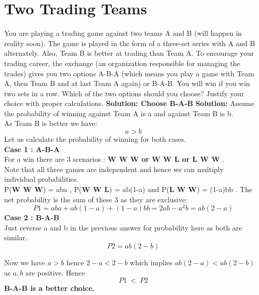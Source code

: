 \documentclass[12pt]{article}
\begin{document}
\section{Two Trading Teams}
You are playing a trading game against two teams A and B (will happen in reality soon). The
game is played in the form of a three-set series with A and B alternately. Also, Team B is better at
trading than Team A. To encourage your trading career, the exchange (an organization responsible
for managing the trades) gives you two options A-B-A (which means you play a game with Team A, then Team B and at last Team A again) or B-A-B. You will win if you win two sets in a row.
Which of the two options should you choose? Justify your choice with proper calculations.
\newline
\textbf{Solution: Choose B-A-B}
\newline \newline
\textbf{Solution: }
\newline
Assume the probability of winning against Team A is a and against Team B is b.\\
As Team B is better we have:  
\begin{equation}
    a > b
\end{equation}
Let us calculate the probability of winning for both cases.\\
\newline
\textbf{Case 1 : A-B-A} \\
For a win there are 3 scenarios : \textbf{W W W or W W L or L W W} . \\
Note that all three games are independent and hence we can multiply \\individual probabilities.\\
P(\textbf{W W W}) = aba , P(\textbf{W W L}) = ab(1-a) and P(\textbf{L W W}) = (1-a)bb .
The net probability is the sum of these 3 as they are exclusive: 
\begin{equation}
    P1 = aba+ab(1-a)+(1-a)bb = 2ab - a^2b = ab(2-a) 
\end{equation}
\newline
\textbf{Case 2 : B-A-B} \\
Just reverse a and b in the previous answer for probability here as both are similar.
\begin{equation}
    P2 = ab(2-b)
\end{equation}

Now we have $a>b$ hence $2-a<2-b$ which implies $ab(2-a)<ab(2-b)$ as $a,b$ are positive.
Hence 
\begin{equation*}
    P1\ <\ P2
\end{equation*}
\newline
\textbf{B-A-B is a better choice.}
\end{document}
